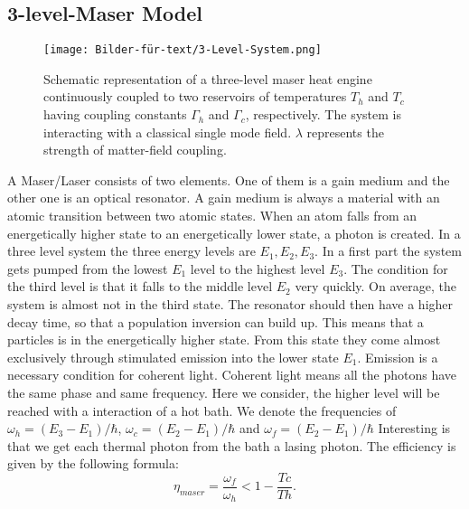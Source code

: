 \documentclass[12pt,a4paper]{article}
\begin{document}
\subsection{3-level-Maser Model}
\begin{figure}[h!] 
\texttt{[image: Bilder-für-text/3-Level-System.png]}
\caption{Schematic representation of a three-level maser heat engine
continuously coupled to two reservoirs of temperatures $T_h$ and
$T_c$ having coupling constants $\Gamma_h$ and $\Gamma_c$, respectively. The
system is interacting with a classical single mode field. $\lambda$
represents the strength of matter-field coupling.}
\end{figure}
A Maser/Laser consists of two elements. One of them is a gain medium and the other one is an optical resonator. A gain medium is always a material with an atomic transition between two atomic states. When an atom falls from an energetically higher state to an energetically lower state, a photon is created.
In a three level system the three energy levels are $E_1,E_2,E_3$. In a first part the system gets pumped from the lowest $E_1$ level to the highest level $ E_3$. The condition for the third level is that it falls to the middle level $ E_2$ very quickly. On average, the system is almost not in the third state. The resonator should then have a higher decay time, so that a population inversion can build up. This means that a particles is in the energetically higher state. From this state they come almost exclusively through stimulated emission into the lower state $ E_1$. 
Emission is a necessary condition for coherent light. Coherent light means all the photons have the same phase and same frequency. \cite{Li2017}
Here we consider, the higher level will be reached with a interaction of a hot bath.  
We denote the frequencies of $\omega_h=(E_3-E_1)/\hbar$, $\omega_c=(E_2-E_1)/\hbar$ and $\omega_f=(E_2-E_1)/\hbar$
Interesting is that we get each thermal photon from the bath a lasing photon. 
The efficiency is given by the following formula:
\begin{equation}
\eta_{maser}=\frac{\omega_f}{\omega_h}<1-\frac{Tc}{Th}.
\end{equation}
\end{document}
